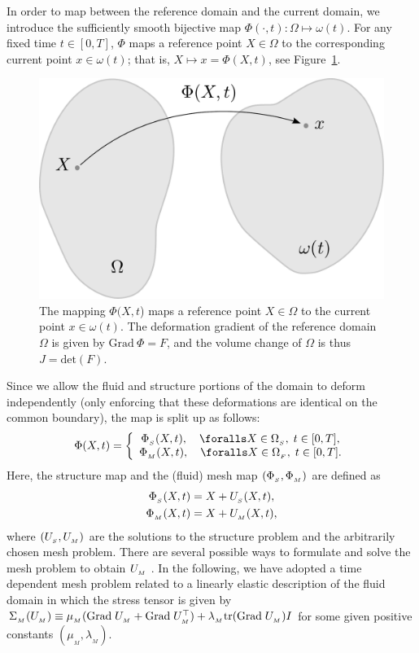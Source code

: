 In order to map between the reference domain and the current domain,
we introduce the sufficiently smooth bijective map $\Phi(\cdot,
t):\Omega\mapsto \omega(t)$.  For any fixed time $t\in[0,T]$, $\Phi$
maps a reference point $X\in\Omega$ to the corresponding current point
$x\in\omega(t)$; that is, $X \mapsto x = \Phi(X,t)$, see
Figure~\ref{selim:fig:mapping}.

\begin{figure}
  \centering
  \includegraphics[width=\smallfig]{chapters/selim/pdf/mapping.pdf}
  \caption{The mapping $\Phi(X,t$) maps a reference point $X\in\Omega$
    to the current point $x\in\omega(t)$. The deformation gradient of
    the reference domain $\Omega$ is given by $\textrm{Grad}\:\Phi =
    F$, and the volume change of $\Omega$ is thus $J = \textrm{det}(F)$.}
  \label{selim:fig:mapping}
\end{figure}

Since we allow the fluid and structure portions of the domain to
deform independently (only enforcing that these deformations are
identical on the common boundary), the map is split up as follows:
\begin{equation}
\label{selim:eq:ALEmapI}
\Phi(X,t) =
\left\{
\begin{array}{ccc}
\PhiS(X, t), \quad \foralls X\in\OS,\; t\in[0,T],\\
\PhiM(X, t), \quad \foralls X\in\OF,\; t\in[0,T].
\end{array}
\right.
\end{equation}
Here, the structure map and the (fluid) mesh map $(\Phi_{_{S}}, \Phi_{_{M}})$ are
defined as
\begin{align}
\label{selim:eq:ALEmapII}
\Phi_{_{S}}(X, t) &= X + U_{_{S}}(X,t),\\
\Phi_{_{M}}(X, t) &= X + U_{_{M}}(X,t),
\end{align}
where $(U_{_{S}}, U_{_{M}})$ are the solutions to the structure problem and the
arbitrarily chosen mesh problem.  There are several
possible ways to formulate and solve the mesh problem to obtain
$U_{_{M}}$ \citep{HermanssonHansbo2003, LopezNigroStorti2008}.  In the
following, we have adopted a time dependent mesh problem related to a
linearly elastic description of the fluid domain in which the stress
tensor is given by $\Sigma_{_{M}}(U_{_{M}})\equiv \mu_{{_M}}(\textrm{Grad}\;U_{_{M}} +
\textrm{Grad}\;U_{_{M}}^{\top})+ \lambda_{_{M}}\textrm{tr}(\textrm{Grad}\;U_{_{M}})I$ for some given
positive constants $(\mu_{{_M}},\lambda_{_{M}})$.

